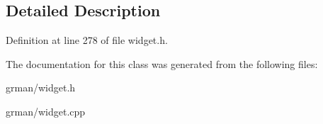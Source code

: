 \subsection{Detailed Description}


Definition at line 278 of file widget.\+h.



The documentation for this class was generated from the following files\+:\begin{DoxyCompactItemize}
\item 
grman/widget.\+h\item 
grman/widget.\+cpp\end{DoxyCompactItemize}
